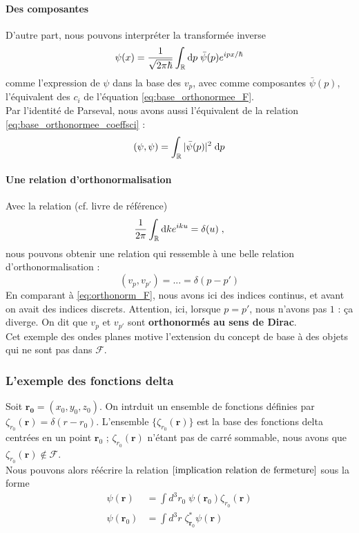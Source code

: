 \documentclass[../notesdecours.tex]{subfiles}
\begin{document}
\paragraph{Des composantes}
D'autre part, nous pouvons interpréter la transformée inverse
$$\psi(x) = \dfrac{1}{\sqrt{2\pi\hbar}} \int_{\mathbb R}\mathrm{d} p \; \bar\psi(p) e^{ipx/\hbar}$$
comme l'expression de $\psi$ dans la base des $v_p$, avec comme composantes $\bar \psi(p)$, l'équivalent des $c_i$ de l'équation \eqref{eq:base_orthonormee_F}. \\

Par l'identité de Parseval, nous avons aussi l'équivalent de la relation \eqref{eq:base_orthonormee_coeffsci} :
$$(\psi, \psi) = \int_{\mathbb R} |\bar \psi(p)|^2 \; \mathrm{d} p$$
\paragraph{Une relation d'orthonormalisation}
Avec la relation (cf. livre de référence) 
$$\dfrac{1}{2\pi} \int_{\mathbb R} \mathrm{d} k e^{iku} = \delta(u) \; ,$$
nous pouvons obtenir une relation qui ressemble à une belle relation d'orthonormalisation :
$$(v_p, v_{p'}) = ... = \delta(p-p')$$
En comparant à \eqref{eq:orthonorm_F}, nous avons ici des indices continus, et avant on avait des indices discrets. Attention, ici, lorsque $p = p'$, nous n'avons pas $1$ : ça diverge. On dit que $v_p$ et $v_{p'}$ sont \textbf{orthonormés au sens de Dirac}. \\

Cet exemple des ondes planes motive l'extension du concept de base à des objets qui ne sont pas dans $\mathcal{F}$.
\subsubsection{L'exemple des fonctions delta}
Soit $\bm{r_0} = (x_0,y_0,z_0)$. On intrduit un ensemble de fonctions définies par $\zeta_{r_0} (\bm{r}) = \delta(r-r_0)$. L'ensemble $\{\zeta_{r_0}(\bm{r})\}$ est la base des fonctions delta centrées en un point $\bm{r}_0$ ; $\zeta_{r_0} (\bm{r})$ n'étant pas de carré sommable, nous avons que $\zeta_{r_0} (\bm{r}) \notin \mathcal{F}$.\\

Nous pouvons alors réécrire la relation $\eqref{implication relation de fermeture}$ sous la forme
\begin{align}
\psi (\bm{r}) &= \int d^3r_0 \; \psi(\bm{r}_0)\zeta_{r_0} (\bm{r})\\
\psi (\bm{r}_0) &= \int d^3r \; \zeta_{\bm{r}_0}^* \psi(\bm{r})
\end{align}
\end{document}
